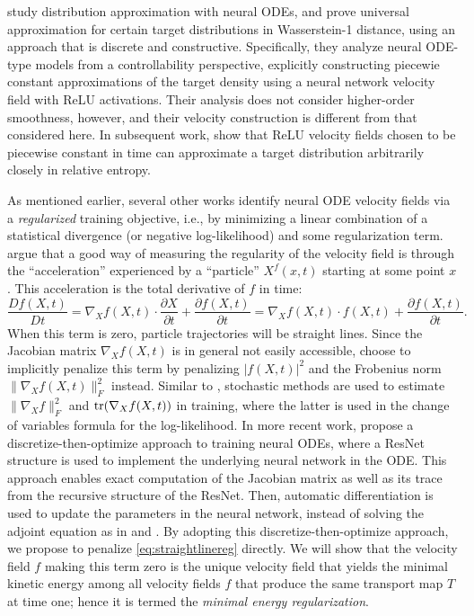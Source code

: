 \citet{NeuralODE-Control} study distribution approximation with neural ODEs, and prove universal approximation for certain target distributions in Wasserstein-1 distance, using an approach that is discrete and constructive. Specifically, they analyze neural ODE-type models from a controllability perspective, explicitly constructing piecewie constant approximations of the target density using a neural network velocity field with ReLU activations. Their analysis does not consider higher-order smoothness, however, and their velocity construction is different from that considered here. In subsequent work, \citet{alvarez2024constructive} show that ReLU velocity fields chosen to be piecewise constant in time can approximate a target distribution arbitrarily closely in relative entropy. 
 

As mentioned earlier, several other works identify neural ODE velocity fields via a \textit{regularized} training objective, i.e., by minimizing a linear combination of a statistical divergence (or negative log-likelihood) and some regularization term.
%
\citet{HowToTrain} argue that a good way of measuring the regularity of
the velocity field is through the ``acceleration'' experienced by a ``particle'' $X^f(x,t)$ starting at some point $x$. This acceleration is the total derivative of $f$ in time: 
\begin{equation}\label{eq:straightlinereg}
  \frac{ D f(X,t)}{D t} = \nabla_X f(X,t) \cdot \frac{ \partial X}{ \partial t} + \frac{\partial f(X,t)}{ \partial t} = \nabla_X f(X,t) \cdot f(X,t) + \frac{\partial f(X,t)}{\partial t}.
\end{equation}
When this term is zero, particle trajectories will be straight lines. Since the Jacobian matrix $\nabla_X f(X,t)$ is
in general not easily accessible, \citet{HowToTrain} choose to
implicitly penalize this term by penalizing $|f(X,t)|^2$ and the
Frobenius norm $\|\nabla_X f(X,t)\|_F^2$ instead. Similar to
\citet{ffjord}, stochastic methods are used  to
estimate $\|\nabla_X f\|_F^2$ and ${\mathrm{tr}}(\nabla_X f(X,t))$ in training, where the latter is used in the change of variables formula for the log-likelihood. In more recent work, \citet{OTFlow} propose a discretize-then-optimize
approach to training neural ODEs, where a ResNet structure is used to
implement the underlying neural network in the ODE. This approach
enables exact computation of the Jacobian matrix as well as its trace
from the recursive structure of the ResNet. Then, automatic
differentiation is used to update the parameters in the neural
network, instead of solving the adjoint equation as in \citet{ffjord}
and \citet{HowToTrain}. By adopting this discretize-then-optimize approach, we propose to penalize \eqref{eq:straightlinereg} directly. We will show that the velocity field $f$ making this term zero is the unique velocity field that yields the minimal kinetic energy among all velocity fields $f$ that produce the same transport map $T$ at time one; hence it is termed the \textit{minimal energy regularization}. 


